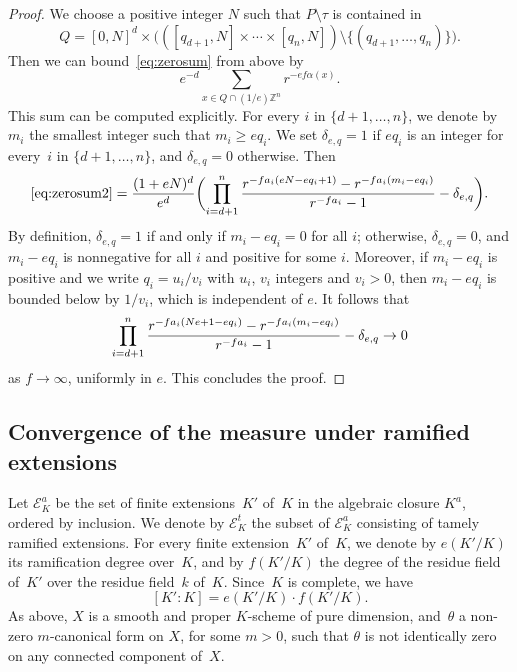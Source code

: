 \documentclass[11pt]{article}
\let\mathcal\mathscr
\theoremstyle{definition}
\numberwithin{equation}{subsection}
\newcommand{\Z}{\ensuremath{\mathbb{Z}}}
\let\form\theta
\begin{document}
\begin{proof}
We choose a positive integer $N$ such that
$P\setminus \tau$ is contained in
\[
Q=[0,N]^{d}\times \bigl(([q_{d+1},N]\times \cdots \times [q_{n},N])\setminus \{(q_{d+1},\ldots,q_n)\}\bigr).
\]
Then we can bound~\eqref{eq:zerosum} from above by
\begin{equation}\label{eq:zerosum2}
e^{-d}\sum_{x\in Q\cap (1/e)\Z^n}r^{-ef\alpha(x)}.
\end{equation}
This sum can be computed explicitly. For every $i$ in $\{d+1,\ldots,n\}$, we denote by $m_i$ the smallest integer such that
$m_i\geq eq_i$. We set $\delta_{e,q}=1$ if $eq_i$ is an integer for every~$i$ in $\{d+1,\ldots,n\}$, and $\delta_{e,q}=0$ otherwise. Then
\[
\eqref{eq:zerosum2}=\frac{(1+eN)^d}{e^d}\biggl( \prod_{i=d+1}^{n}\frac{r^{-fa_i(eN-eq_i+1)}- r^{-fa_i(m_i-eq_i)}}{r^{-fa_i}-1} - \delta_{e,q}\biggr).
\]
By definition, $\delta_{e,q}=1$ if and only if $m_i-eq_i=0$ for all $i$; otherwise, $\delta_{e,q}=0$, and $m_i-eq_i$ is nonnegative for all $i$ and positive for some $i$. Moreover, if $m_i-eq_i$ is positive and we write $q_i=u_i/v_i$ with $u_i$, $v_i$ integers and $v_i>0$, then $m_i-eq_i$ is bounded below by $1/v_i$, which is independent of $e$.
It follows that\vspace*{-3pt}
\[
\prod_{i=d+1}^{n}\frac{r^{-fa_i(Ne+1-eq_i)}- r^{-fa_i(m_i-eq_i)}}{r^{-fa_i}-1} - \delta_{e,q} \to 0\vspace*{-3pt}
\]
as $f\to \infty$, uniformly in $e$. This concludes the proof.
\end{proof}

\subsection{Convergence of the measure under ramified extensions}
Let $\mathcal{E}^a_K$ be the set of finite extensions~$K'$ of~$K$ in the algebraic closure $K^a$, ordered by inclusion. We denote by
$\mathcal{E}^t_K$ the subset of $\mathcal{E}^a_K$ consisting of tamely ramified extensions.
For every finite extension~$K'$ of~$K$, we denote by $e(K'/K)$ its ramification degree over~$K$, and by $f(K'/K)$ the degree of the residue field of~$K'$ over the residue field~$k$ of~$K$. Since~$K$ is complete, we have\vspace*{-3pt}
\[
[K'\colon K]=e(K'/K)\cdot f(K'/K).
\]
As above, $X$ is a smooth and proper $K$\nobreakdash-scheme of pure dimension, and~$\form$ a non-zero $m$-canonical form on $X$, for some $m>0$, such that
$\form$ is not identically zero on any connected component of~$X$.
\end{document}
